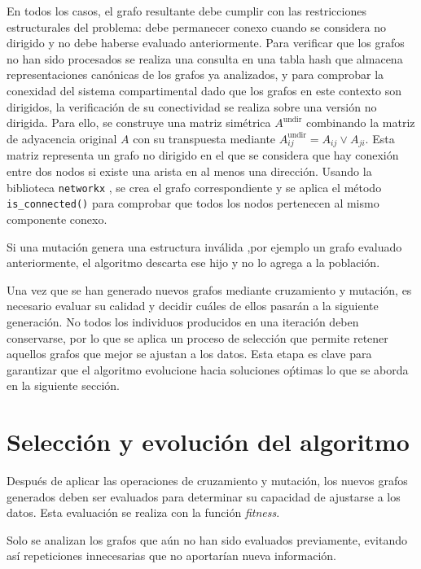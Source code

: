 En todos los casos, el grafo resultante debe cumplir con las restricciones estructurales del problema: debe permanecer conexo cuando se considera no dirigido y no debe 
haberse evaluado anteriormente. Para verificar que los grafos no han sido procesados se realiza una consulta en una tabla hash que almacena representaciones canónicas 
de los grafos ya analizados, y para comprobar la conexidad del sistema compartimental dado que los grafos en este contexto son dirigidos, la verificación de su 
conectividad se realiza sobre una versión no dirigida. Para ello, se construye una matriz simétrica \(A^{\text{undir}}\) combinando la matriz de adyacencia original 
\(A\) con su transpuesta mediante \(A^{\text{undir}}_{ij} = A_{ij} \lor A_{ji}\). Esta matriz representa un grafo no dirigido en el que se considera que hay conexión 
entre dos nodos si existe una arista en al menos una dirección. Usando la biblioteca \texttt{networkx} \cite{Hagberg2008}, se crea el grafo correspondiente y se aplica el método 
\texttt{is\_connected()} para comprobar que todos los nodos pertenecen al mismo componente conexo.

Si una mutación genera una estructura inválida ,por ejemplo un grafo evaluado anteriormente, el algoritmo descarta ese hijo y no lo agrega
a la población.

Una vez que se han generado nuevos grafos mediante cruzamiento y mutación, es necesario evaluar su calidad y decidir cuáles de ellos pasarán a la siguiente generación. 
No todos los individuos producidos en una iteración deben conservarse, por lo que se aplica un proceso de selección que permite retener aquellos grafos que mejor se 
ajustan a los datos. Esta etapa es clave para garantizar que el algoritmo evolucione hacia soluciones o\'ptimas lo que se aborda en la siguiente sección.

\section{Selección y evolución del algoritmo}
\label{sec:seleccion}

Después de aplicar las operaciones de cruzamiento y mutación, los nuevos grafos generados deben ser evaluados para determinar su capacidad de ajustarse a los datos. 
Esta evaluación se realiza con la función \textit{fitness}.

Solo se analizan los grafos que aún no han sido evaluados previamente, evitando así repeticiones innecesarias que no aportarían nueva información.

